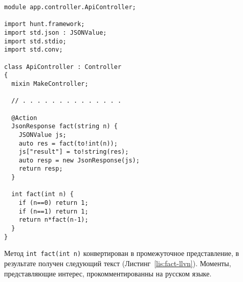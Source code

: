 \documentclass{studrep}
\begin{document}
\begin{verbatim}
module app.controller.ApiController;

import hunt.framework;
import std.json : JSONValue;
import std.stdio;
import std.conv;

class ApiController : Controller
{
  mixin MakeController;

  // . . . . . . . . . . . . . .

  @Action
  JsonResponse fact(string n) {
    JSONValue js;
    auto res = fact(to!int(n));
    js["result"] = to!string(res);
    auto resp = new JsonResponse(js);
    return resp;
  }

  int fact(int n) {
    if (n==0) return 1;
    if (n==1) return 1;
    return n*fact(n-1);
  }
}
\end{verbatim}

Метод \verb-int fact(int n)- конвертирован в промежуточное представление, в результате получен следующий текст (Листинг~\ref{lis:fact-llvn}).  Моменты, представляющие интерес, прокомментированны на русском языке.
\end{document}
